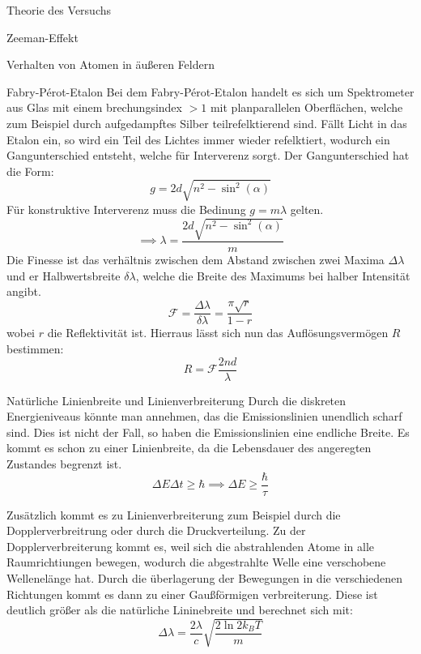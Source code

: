\documentclass[pdftex, a4paper,11pt, twoside, ngerman]{report}
\begin{document}
\begin{chapter}{Theorie des Versuchs}
\begin{section}{Zeeman-Effekt}
\begin{subsection}{Verhalten von Atomen in äußeren Feldern}
        \end{subsection}
        \begin{subsection}{Fabry-Pérot-Etalon}
            Bei dem Fabry-Pérot-Etalon handelt es sich um Spektrometer aus Glas mit einem brechungsindex $>1$ mit planparallelen Oberflächen, welche zum Beispiel durch aufgedampftes Silber teilrefelktierend sind.
            Fällt Licht in das Etalon ein, so wird ein Teil des Lichtes immer wieder refelktiert, wodurch ein Gangunterschied entsteht, welche für Interverenz sorgt.
            Der Gangunterschied hat die Form:
            \[
                g = 2d\sqrt{n^2-\sin^2(\alpha)}
            \]
            Für konstruktive Interverenz muss die Bedinung $g = m\lambda$ gelten.
            \[
                \implies \lambda = \frac{2d\sqrt{n^2-\sin^2(\alpha)}}m
            \]
            Die Finesse ist das verhältnis zwischen dem Abstand zwischen zwei Maxima $\Delta\lambda$ und er Halbwertsbreite $\delta\lambda$, welche die Breite des Maximums bei halber Intensität angibt.
            \[
                \mathcal{F}=\frac{\Delta\lambda}{\delta\lambda} = \frac{\pi\sqrt r}{1-r}
            \]
            wobei $r$ die Reflektivität ist.
            Hierraus lässt sich nun das Auflösungsvermögen $R$ bestimmen:
            \[
                R = \mathcal{F}\frac{2nd}{\lambda}
            \]

            
        \end{subsection}
        \begin{subsection}{Natürliche Linienbreite und Linienverbreiterung}
            Durch die diskreten Energieniveaus könnte man annehmen, das die Emissionslinien unendlich scharf sind.
            Dies ist nicht der Fall, so haben die Emissionslinien eine endliche Breite.
            Es kommt es schon zu einer Linienbreite, da die Lebensdauer des angeregten Zustandes begrenzt ist.
            \[
                \Delta E\Delta t \geq \hbar \implies \Delta E \geq \frac \hbar\tau
            \]

            Zusätzlich kommt es zu Linienverbreiterung zum Beispiel durch die Dopplerverbreitrung oder durch die Druckverteilung.
            Zu der Dopplerverbreiterung kommt es, weil sich die abstrahlenden Atome in alle Raumrichtiungen bewegen, wodurch die abgestrahlte Welle eine verschobene Wellenelänge hat. 
            Durch die überlagerung der Bewegungen in die verschiedenen Richtungen kommt es dann zu einer Gaußförmigen verbreiterung.
            Diese ist deutlich größer als die natürliche Lininebreite und berechnet sich mit:
            \[
                \Delta\lambda = \frac{2\lambda}{c}\sqrt{\frac{2\ln 2k_B T}{m}}
            \]
           

\end{subsection}
\end{section}
\end{chapter}
\end{document}
